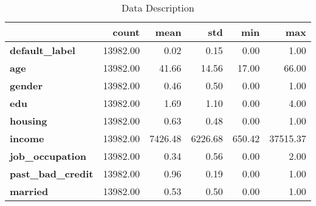 \begin{table}
\caption{Data Description}
\label{tab:data_description}
\begin{tabular}{lrrrrr}
\toprule
 & count & mean & std & min & max \\
\midrule
\textbf{default\_label} & 13982.00 & 0.02 & 0.15 & 0.00 & 1.00 \\
\textbf{age} & 13982.00 & 41.66 & 14.56 & 17.00 & 66.00 \\
\textbf{gender} & 13982.00 & 0.46 & 0.50 & 0.00 & 1.00 \\
\textbf{edu} & 13982.00 & 1.69 & 1.10 & 0.00 & 4.00 \\
\textbf{housing} & 13982.00 & 0.63 & 0.48 & 0.00 & 1.00 \\
\textbf{income} & 13982.00 & 7426.48 & 6226.68 & 650.42 & 37515.37 \\
\textbf{job\_occupation} & 13982.00 & 0.34 & 0.56 & 0.00 & 2.00 \\
\textbf{past\_bad\_credit} & 13982.00 & 0.96 & 0.19 & 0.00 & 1.00 \\
\textbf{married} & 13982.00 & 0.53 & 0.50 & 0.00 & 1.00 \\
\bottomrule
\end{tabular}
\end{table}
